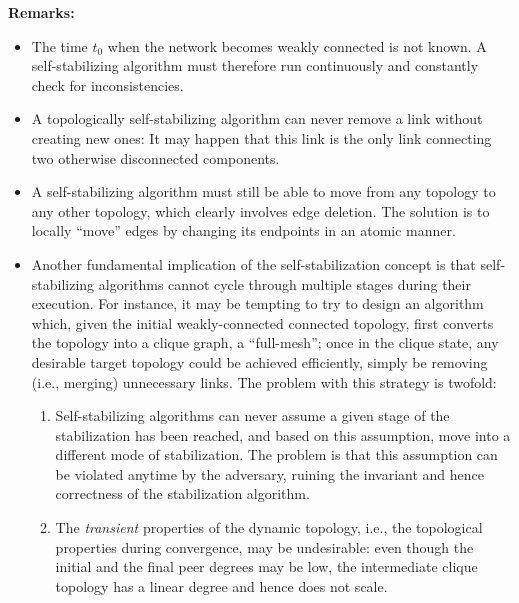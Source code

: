 \documentclass[a4paper,10pt,openany, oneside]{book}
\newlength{\remarkskip}
\newenvironment{remarks}[1][Remarks]{\vspace{\remarkskip}
\needspace{3\baselineskip}
\noindent\textbf{#1:}\begin{itemize}[leftmargin=1.5cm]}{\end{itemize}}
\begin{document}
\begin{remarks}
\item
  The time $t_0$ when the network becomes weakly connected is not known.
  A self-stabilizing algorithm must therefore run continuously and constantly check for inconsistencies.
\item 
  A topologically self-stabilizing algorithm can never remove a link without creating new ones: It may happen that this link is the only link connecting two otherwise disconnected components.

\item
  A self-stabilizing algorithm must still be able to move from any topology to any other topology, which clearly involves edge deletion.
  The solution is to locally ``move'' edges by changing its endpoints in an atomic manner.

\item
  Another fundamental implication of the self-stabilization concept is that self-stabilizing algorithms cannot cycle through multiple stages during their execution.
  For instance, it may be tempting to try to design an algorithm which, given the initial weakly-connected connected topology, first converts the topology into a clique graph, a ``full-mesh''; once in the clique state, any desirable target topology could be achieved efficiently, simply be removing (i.e., merging) unnecessary links.
  The problem with this strategy is twofold:
  \begin{enumerate} 
  \item
    Self-stabilizing algorithms can never assume a given stage of the stabilization has been reached, and based on this assumption, move into a different mode of stabilization.
    The problem is that this assumption can be violated anytime by the adversary, ruining the invariant and hence correctness of the stabilization algorithm. 
  \item
    The \emph{transient} properties of the dynamic topology, i.e., the topological properties during convergence, may be undesirable: even though the initial and the final peer degrees may be low, the intermediate clique topology has a linear degree and hence does not scale. 
  \end{enumerate} 

  
\end{remarks}
\end{document}
